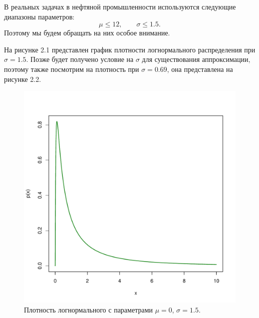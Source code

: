 \documentclass[specialist, substylefile = spbu.rtx,
subf,href,colorlinks=true, 12pt]{disser}
\begin{document}
	В реальных задачах в нефтяной промышленности используются следующие диапазоны параметров:
	\[\mu\leq12, \quad\quad \sigma\leq1.5.\]
	Поэтому мы будем обращать на них особое внимание.
	
	На рисунке 2.1 представлен график плотности логнормального распределения при $\sigma = 1.5$. Позже будет получено условие на $\sigma$ для существования аппроксимации, поэтому также посмотрим на плотность при $\sigma = 0.69$, она представлена на рисунке 2.2.
	
	\begin{figure}[!hhh]
		\begin{center}
			\begin{minipage}[h]{0.8\linewidth}
				\includegraphics[width=1\linewidth]{img_new/density1.pdf}
				\caption{Плотность логнормального с параметрами $\mu = 0$, $\sigma = 1.5$. } %
				\label{ris_den1} %
			\end{minipage}
			\end{center}
	\end{figure}
	
\end{document}
